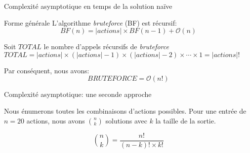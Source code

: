 \begin{frame}{Complexité asymptotique en temps de la solution naïve}

  \begin{block}{Forme générale}
    L'algorithme \textit{bruteforce} (BF) est récursif:
    \begin{equation}
      BF(n) = |actions| \times BF(n - 1) + \mathcal{O}(n)
    \end{equation}
  \end{block}

  \begin{block}{Soit $TOTAL$ le nombre d'appels récursifs de \textit{bruteforce}}
    $TOTAL = |actions| \times (|actions| - 1) \times (|actions| - 2) \times \cdots \times 1 = |actions|!$
  \end{block}

  \begin{block}{Par conséquent, nous avons:}
    \begin{equation}
      BRUTEFORCE = \mathcal{O}(n!)
    \end{equation}
  \end{block}

\end{frame}

\begin{frame}{Complexité asymptotique: une seconde approche}
  \begin{block}{}
    Nous énumerons toutes les combinaisons d'actions possibles.  Pour
    une entrée de $n = 20$ actions, nous avons $\binom{n}{k}$
    solutions avec $k$ la taille de la sortie.
  \end{block}

  \begin{block}{}
    \begin{equation}
      \binom{n}{k} = \frac{n!}{(n - k)! \times k!}
    \end{equation}

  \end{block}
\end{frame}

